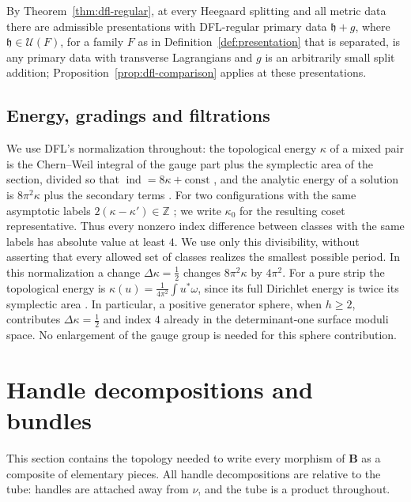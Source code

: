 \documentclass[11pt]{amsart}
\theoremstyle{definition}
\theoremstyle{remark}
\theoremstyle{plain}
\numberwithin{equation}{section}
\newcommand{\ZZ}{\mathbb{Z}}
\newcommand{\bB}{\mathbf{B}}
\newcommand{\ind}{\operatorname{ind}}
\begin{document}
By Theorem~\ref{thm:dfl-regular}, at every Heegaard splitting and all metric data there are
admissible presentations with DFL-regular primary data $\mathfrak h+g$, where $\mathfrak h\in\mathcal
U(F)$, for a family $F$ as in Definition~\ref{def:presentation} that is separated, is any primary data with
transverse Lagrangians and $g$ is an arbitrarily small split addition;
Proposition~\ref{prop:dfl-comparison} applies at these presentations.

\subsection{Energy, gradings and filtrations}\label{subsec:energy-convention}

We use DFL's normalization throughout: the topological energy $\kappa$
of a mixed pair is the Chern--Weil integral of the gauge part plus the
symplectic area of the section, divided so that
$\ind=8\kappa+\text{const}$ \cite[Proposition~3.20]{DFL}, and the analytic
energy of a solution is $8\pi^2\kappa$ plus the secondary terms
\cite[(3.24)]{DFL}. For two configurations with the same asymptotic labels
$2(\kappa-\kappa')\in\ZZ$ \cite[Lemma~3.15]{DFL}; we write $\kappa_0$ for the
resulting coset representative.
Thus every nonzero index difference between classes with the same
labels has absolute value at least $4$. We use only this divisibility,
without asserting that every allowed set of classes realizes the
smallest possible period. In this normalization a change
$\Delta\kappa=\tfrac12$ changes $8\pi^2\kappa$ by $4\pi^2$.
For a pure strip the topological energy is
$\kappa(u)=\frac1{4\pi^2}\int u^*\omega$, since its full Dirichlet
energy is twice its symplectic area
\cite[Proposition~4.69]{DFL}. In particular, a positive generator
sphere, when $h\ge2$, contributes $\Delta\kappa=\tfrac12$ and index $4$ already
in the determinant-one surface moduli space. No enlargement of
the gauge group is needed for this sphere contribution.

\section{Handle decompositions and bundles}\label{sec:handles}

This section contains the topology needed to write every morphism of
$\bB$ as a composite of elementary pieces. All handle decompositions are
relative to the tube: handles are attached away from $\nu$, and the tube
is a product throughout.
\end{document}
